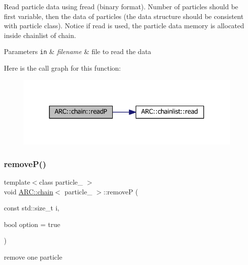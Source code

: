 Read particle data using fread (binary format). Number of particles should be first variable, then the data of particles (the data structure should be consistent with particle class). Notice if read is used, the particle data memory is allocated inside chainlist of chain. 
\begin{DoxyParams}[1]{Parameters}
\mbox{\tt in}  & {\em filename} & file to read the data \\
\hline
\end{DoxyParams}
Here is the call graph for this function\+:
\nopagebreak
\begin{figure}[H]
\begin{center}
\leavevmode
\includegraphics[width=317pt]{classARC_1_1chain_a5325cc6945e9992b431450f7846e91e5_cgraph}
\end{center}
\end{figure}
\hypertarget{classARC_1_1chain_ab19c57af30f8eebd5dfac3de2cab2ade}{}\label{classARC_1_1chain_ab19c57af30f8eebd5dfac3de2cab2ade} 
\subsubsection{\texorpdfstring{remove\+P()}{removeP()}}
{\footnotesize\ttfamily template$<$class particle\+\_\+ $>$ \\
void \hyperlink{classARC_1_1chain}{A\+R\+C\+::chain}$<$ particle\+\_\+ $>$\+::removeP (\begin{DoxyParamCaption}\item[{const std\+::size\+\_\+t}]{i,  }\item[{bool}]{option = {\ttfamily true} }\end{DoxyParamCaption})\hspace{0.3cm}{\ttfamily [inline]}}



remove one particle 

